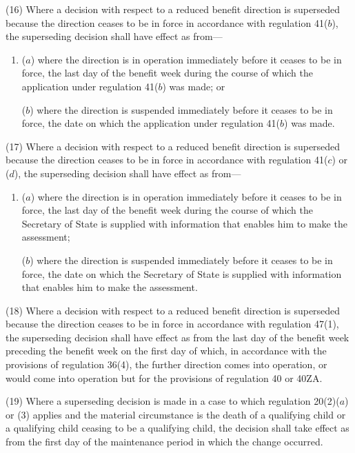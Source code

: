 \documentclass[a4paper,12pt]{article}
\begin{document}
(16) Where a decision with respect to a reduced benefit direction is superseded because the direction ceases to be in force in accordance with regulation 41($b$), the superseding decision shall have effect as from---
\begin{enumerate}\item[]
($a$) where the direction is in operation immediately before it ceases to be in force, the last day of the benefit week during the course of which the application under regulation 41($b$) was made; or

($b$) where the direction is suspended immediately before it ceases to be in force, the date on which the application under regulation 41($b$) was made.
\end{enumerate}

(17) Where a decision with respect to a reduced benefit direction is superseded because the direction ceases to be in force in accordance with regulation 41($c$) or ($d$), the superseding decision shall have effect as from---
\begin{enumerate}\item[]
($a$) where the direction is in operation immediately before it ceases to be in force, the last day of the benefit week during the course of which the Secretary of State is supplied with information that enables him to make the assessment;

($b$) where the direction is suspended immediately before it ceases to be in force, the date on which the Secretary of State is supplied with information that enables him to make the assessment.
\end{enumerate}

(18) Where a decision with respect to a reduced benefit direction is superseded because the direction ceases to be in force in accordance with regulation 47(1), the superseding decision shall have effect as from the last day of the benefit week preceding the benefit week on the first day of which, in accordance with the provisions of regulation 36(4), the further direction comes into operation, or would come into operation but for the provisions of regulation 40 or 40ZA.

(19) Where a superseding decision is made in a case to which regulation 20(2)($a$)  or (3) applies and the material circumstance is the death of a qualifying child or a qualifying child ceasing to be a qualifying child, the decision shall take effect as from the first day of the maintenance period in which the change occurred.
\end{document}
